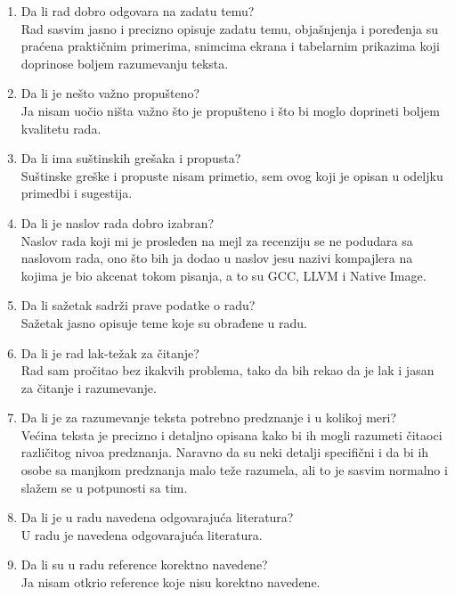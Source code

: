 \documentclass[a4paper]{report}
\begin{document}
\begin{enumerate}
\item Da li rad dobro odgovara na zadatu temu?\\
Rad sasvim jasno i precizno opisuje zadatu temu, objašnjenja i poređenja su praćena praktičnim primerima, snimcima ekrana i tabelarnim prikazima koji doprinose boljem razumevanju teksta.

\item Da li je nešto važno propušteno?\\
Ja nisam uočio ništa važno što je propušteno i što bi moglo doprineti boljem kvalitetu rada.

\item Da li ima suštinskih grešaka i propusta?\\
Suštinske greške i propuste nisam primetio, sem ovog koji je opisan u odeljku primedbi i sugestija.

\item Da li je naslov rada dobro izabran?\\
Naslov rada koji mi je prosleđen na mejl za recenziju se ne podudara sa naslovom rada, ono što bih ja dodao u naslov jesu nazivi kompajlera na kojima je bio akcenat tokom pisanja, a to su GCC, LLVM i Native Image.

\item Da li sažetak sadrži prave podatke o radu?\\
Sažetak jasno opisuje teme koje su obrađene u radu.

\item Da li je rad lak-težak za čitanje?\\
Rad sam pročitao bez ikakvih problema, tako da bih rekao da je lak i jasan za čitanje i razumevanje.

\item Da li je za razumevanje teksta potrebno predznanje i u kolikoj meri?\\
Većina teksta je precizno i detaljno opisana kako bi ih mogli razumeti čitaoci različitog nivoa predznanja. Naravno da su neki detalji specifični i da bi ih osobe sa manjkom predznanja malo teže razumela, ali to je sasvim normalno i slažem se u potpunosti sa tim.

\item Da li je u radu navedena odgovarajuća literatura?\\
U radu je navedena odgovarajuća literatura.

\item Da li su u radu reference korektno navedene?\\
Ja nisam otkrio reference koje nisu korektno navedene.


\end{enumerate}
\end{document}
